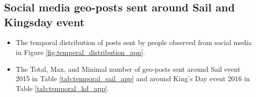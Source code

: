 \chapter{}\label{tabs_and_cal}





\section{Social media geo-posts sent around Sail and Kingsday event}

\begin{itemize}
\item The temporal distribution of posts sent by people observed from social media in Figure \ref{fig:temperal_distribution_app}.
\item The Total, Max, and Minimal number of geo-posts sent around Sail event 2015 in Table \ref{tab:temporal_sail_app} and around King's Day event 2016 in Table \ref{tab:temporal_kd_app}.
\end{itemize}


\begin{figure*}
\centering     %

\caption{The temporal distribution of posts sent by people observed from social media}
\label{fig:temperal_distribution_app}
\end{figure*}



